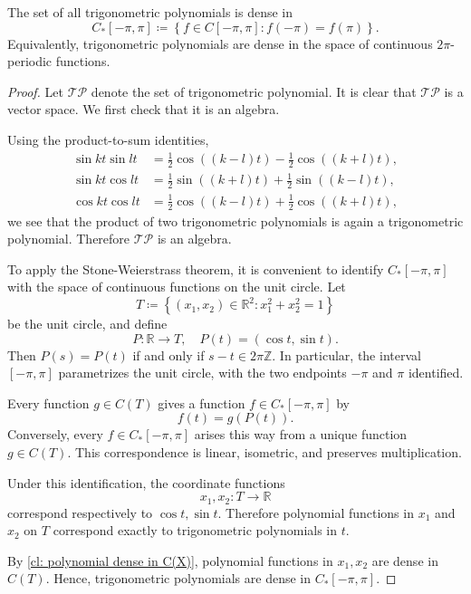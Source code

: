 \begin{corollary}
    The set of all trigonometric polynomials is dense in 
    \[
        C_{\ast}  [-\pi , \pi ] \coloneqq \left\{ f \in C[-\pi , \pi]: f(-\pi ) = f(\pi ) \right\}. 
    \]
    Equivalently, trigonometric polynomials are dense in the space of continuous \(2 \pi\)-periodic functions.  
\end{corollary}
\begin{proof}
    Let \(\mathcal{T} \mathcal{P} \) denote the set of trigonometric polynomial. It is clear that \(\mathcal{T} \mathcal{P} \) is a vector space. We first check that it is an algebra. 

    Using the product-to-sum identities, 
    \begin{align*}
        \sin kt \sin lt &= \frac{1}{2} \cos ((k - l) t) - \frac{1}{2} \cos ((k + l) t), \\
        \sin kt \cos lt &= \frac{1}{2} \sin ((k + l) t) + \frac{1}{2} \sin ((k - l) t), \\
        \cos kt \cos lt &= \frac{1}{2} \cos ((k - l) t) + \frac{1}{2} \cos ((k + l) t),
    \end{align*}  
    we see that the product of two trigonometric polynomials is again a trigonometric polynomial. Therefore \(\mathcal{T} \mathcal{P} \) is an algebra. 

    To apply the Stone-Weierstrass theorem, it is convenient to identify \(C_{\ast} [-\pi , \pi ]\) with the space of continuous functions on the unit circle. Let 
    \[
        T \coloneqq \left\{ (x_1, x_2) \in \mathbb{R} ^2: x_1^2 + x_2^2 = 1 \right\}
    \] 
    be the unit circle, and define 
    \[
        P: \mathbb{R} \to T, \quad P(t) = (\cos t, \sin t).
    \]
    Then \(P(s) = P(t)\) if and only if \(s - t \in 2 \pi \mathbb{Z} \). In particular, the interval \([-\pi , \pi ]\) parametrizes the unit circle, with the two endpoints \(-\pi \) and \(\pi \) identified. 

    Every function \(g \in C(T)\) gives a function \(f \in C_{\ast} [-\pi , \pi ]\) by 
    \[
        f(t) = g(P(t)).
    \]       
    Conversely, every \(f \in C_{\ast} [-\pi , \pi ]\) arises this way from a unique function \(g \in C(T)\). This correspondence is linear, isometric, and preserves multiplication. 

    Under this identification, the coordinate functions 
    \[
        x_1, x_2 : T \to \mathbb{R}
    \]  
    correspond respectively to \(\cos t, \sin t\). Therefore polynomial functions in \(x_1\) and \(x_2\) on \(T\) correspond exactly to trigonometric polynomials in \(t\). 

    By \autoref{cl: polynomial dense in C(X)}, polynomial functions in \(x_1, x_2\) are dense in \(C(T)\). Hence, trigonometric polynomials are dense in \(C_{\ast}  [-\pi , \pi ]\).         
\end{proof}

